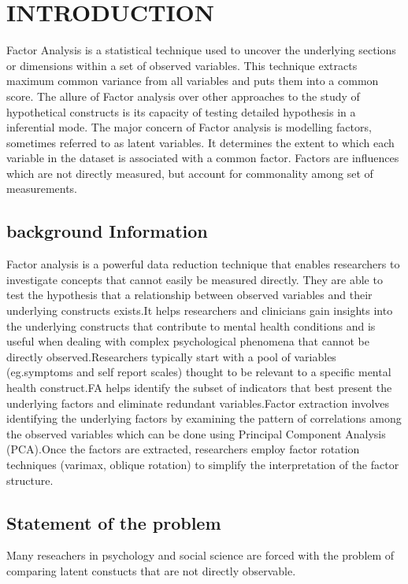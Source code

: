 \documentclass[12pt]{article}
\begin{document}
\newpage
\section{INTRODUCTION}
Factor Analysis is a statistical technique used to uncover the underlying sections or dimensions within a set of observed variables. This technique extracts maximum common variance from all variables and puts them into a common score. The allure of Factor analysis over other approaches to the study of hypothetical constructs is its capacity of testing detailed hypothesis in a inferential mode. The major concern of Factor analysis is modelling factors, sometimes referred to as latent variables. It determines the extent to which each variable in the dataset is associated with a common factor. Factors are influences which are not directly measured, but account for commonality among set of measurements.

\subsection{background Information}
Factor analysis is a powerful data reduction technique that enables researchers to investigate concepts that cannot easily be measured directly. They are able to test the hypothesis that a relationship between observed variables and their underlying constructs exists.It helps researchers and clinicians gain insights into the underlying constructs that contribute to mental health conditions and is useful when dealing with complex psychological phenomena that cannot be directly observed.Researchers typically start with a pool of variables (eg.symptoms and self report scales) thought to be relevant to a specific mental health construct.FA helps identify the subset of indicators that best present the underlying factors and eliminate redundant variables.Factor extraction involves identifying the underlying factors by examining the pattern of correlations among the observed variables which can be done using Principal Component Analysis (PCA).Once the factors are extracted, researchers employ factor rotation techniques (varimax, oblique rotation) to simplify the interpretation of the factor structure.

\subsection{Statement of the problem}
\noindent Many reseachers in psychology and social science are forced with the problem of comparing latent constucts that are not directly observable.\\
\end{document}
